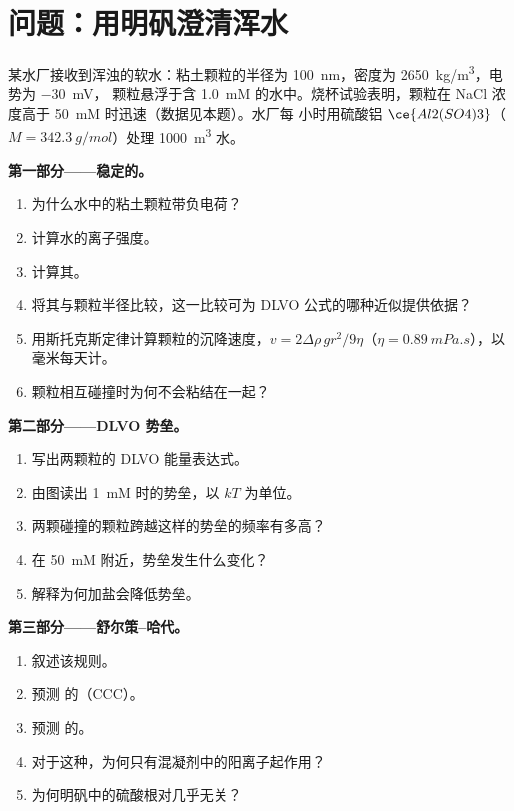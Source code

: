 \section{问题：用明矾澄清浑水}

\begin{problem}
\label{pb:b3:colloids:1}
某水厂接收到浑浊的软水：粘土颗粒的半径为
\qty{100}{nm}，密度为 \qty{2650}{kg/m^3}，电势为 \qty{-30}{mV}，
颗粒悬浮于含 \qty{1.0}{mM}  的水中。烧杯试验表明，颗粒在
NaCl 浓度高于 \qty{50}{mM} 时迅速（数据见本题）。水厂每
小时用硫酸铝 $\ce{Al2(SO4)3}$（$M = \qty{342.3}{g/mol}$）处理 \qty{1000}{m^3} 水。

\medskip\noindent\textbf{第一部分——稳定的。}
\begin{enumerate}
  \item 为什么水中的粘土颗粒带负电荷？
  \item 计算水的离子强度。
  \item 计算其。
  \item 将其与颗粒半径比较，这一比较可为 DLVO
        公式的哪种近似提供依据？
  \item 用斯托克斯定律计算颗粒的沉降速度，$v =
        2\Delta\rho\,gr^2/9\eta$（$\eta = \qty{0.89}{mPa.s}$），以毫米每天计。
  \item 颗粒相互碰撞时为何不会粘结在一起？
\end{enumerate}

\medskip\noindent\textbf{第二部分——DLVO 势垒。}
\begin{enumerate}[resume]
  \item 写出两颗粒的 DLVO 能量表达式。
  \item 由图读出 \qty{1}{mM} 时的势垒，以 $kT$ 为单位。
  \item 两颗碰撞的颗粒跨越这样的势垒的频率有多高？
  \item 在 \qty{50}{mM} 附近，势垒发生什么变化？
  \item 解释为何加盐会降低势垒。
\end{enumerate}

\medskip\noindent\textbf{第三部分——舒尔策–哈代。}
\begin{enumerate}[resume]
  \item 叙述该规则。
  \item 预测  的（CCC）。
  \item 预测  的。
  \item 对于这种，为何只有混凝剂中的阳离子起作用？
  \item 为何明矾中的硫酸根对几乎无关？
\end{enumerate}


\end{problem}
